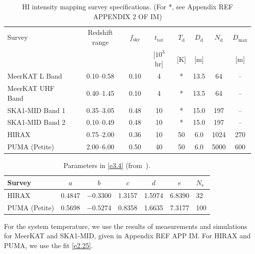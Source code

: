 \begin{table}[ht]
\centering
\caption{\label{tab:tab1} {HI intensity mapping survey specifications. 
(For *, see Appendix REF APPENDIX 2 OF IM)}} 
\vspace*{0.2cm}
\begin{tabular}{|lccccccc|} \hline
Survey & Redshift range & $f_\mathrm{sky}$ & $t_{\mathrm{tot}}$  & $T_{\mathrm{d}}$ & $D_\mathrm{d}$ & $N_\mathrm{d}$ & {$D_\mathrm{max}$} \\
&  & & [$10^{3}$ hr] & [K]  & [m] & & {[m]} \\
\hline\hline 
MeerKAT L Band   & 0.10--0.58 & 0.10 & 4  & * & 13.5 & 64 & -- \\
MeerKAT UHF Band & 0.40--1.45 & 0.10 & 4  & * & 13.5 & 64  & --  \\
SKA1-MID Band 1  & 0.35--3.05 & 0.48 & 10 & * & 15.0 & 197  & --  \\
SKA1-MID Band 2  & 0.10--0.49 & 0.48 & 10 & * & 15.0 & 197  & --  \\
HIRAX            & 0.75--2.00 & 0.36 & 10 & 50 & 6.0  & 1024  & {270}\\
PUMA (Petite)    & 2.00--6.00 & 0.50 & 40 & 50 & 6.0  & 5000 & {600} \\
\hline
\end{tabular}
\end{table}

\vspace*{-0.5cm}
\begin{table}[ht]
\centering
\caption{\label{tab2} {Parameters in \eqref{e3.4}} (from~\cite{Ansari:2018ury}).} 
\vspace*{0.2cm}
\begin{tabular}{|lcccccl|} \hline
Survey & $a$ & $b$ & $c$  & $d$ & $e$ & $N_\mathrm{s}$  \\ \hline\hline 
HIRAX & 0.4847 & $-0.3300$ & 1.3157 & 1.5974 & 6.8390 & 32  \\
PUMA (Petite) & 0.5698 & $-0.5274$ & 0.8358 & 1.6635 & 7.3177 & {100} \\
\hline
\end{tabular}
\end{table}

For the system temperature, we use the results of measurements and simulations for MeerKAT and SKA1-MID, given in Appendix REF APP IM. For HIRAX and PUMA, we use the fit \eqref{e2.25}. 


